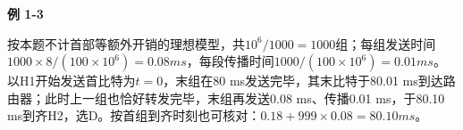 {\color{ink}\bfseries 例 1-3}\par\vspace{1bp}按本题不计首部等额外开销的理想模型，共\(10^{6}/\allowbreak{}1000=\allowbreak{}1000\)组；每组发送时间\(1000\times 8/\allowbreak{}(100\times 10^{6})=\allowbreak{}0.08 ms\)，每段传播时间\(1000/\allowbreak{}(100\times 10^{6})=\allowbreak{}0.01 ms\)。以H1开始发送首比特为\(t=\allowbreak{}0\)，末组在80 ms发送完毕，其末比特于80.01 ms到达路由器；此时上一组也恰好转发完毕，末组再发送0.08 ms、传播0.01 ms，于80.10 ms到齐H2，选D。按首组到齐时刻也可核对：\(0.18+\allowbreak{}999\times 0.08=\allowbreak{}80.10 ms\)。
